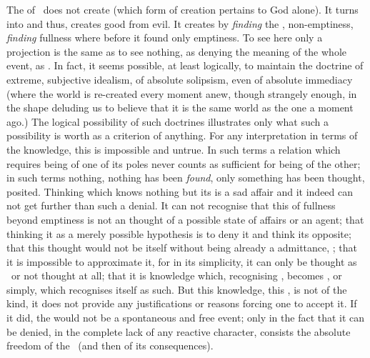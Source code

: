  The  of \yes\ does not create  (which form of creation
 pertains to God alone). It turns  into  and thus, creates good from evil.  It creates
  by {\em finding} the , non-emptiness, {\em
   finding} fullness where before it found only emptiness.  To see here only a
 projection is the same as to see nothing, as denying the meaning of the whole
 event, as .  In fact, it seems possible, at least logically, to maintain the
 doctrine of extreme, subjective idealism, of absolute solipsism, even of
 absolute immediacy (where the world is re-created every moment anew, though
 strangely enough, in the shape deluding us to believe that it is the same world
 as the one a moment ago.) The logical possibility of such doctrines illustrates
 only what such a possibility is worth as a criterion of anything.  For any
 interpretation in terms of the  knowledge, this  is
 impossible and untrue. In such terms a relation which requires being of one of
 its poles never counts as sufficient for being of the other; in such terms
 nothing, nothing  has been {\em found}, only something has been
 thought,  posited. Thinking which knows nothing but its
  is a sad affair and it indeed can not get further than
 such a denial. It can not recognise that this  of fullness beyond
 emptiness is not an  thought of a possible state of affairs or an
  agent; that thinking it as a merely possible hypothesis is to deny
 it and think its opposite; that this thought would not be itself without being
 already a  admittance, ; that it is impossible to
 approximate it, for in its simplicity, it can only be thought as \yes\ or not
 thought at all; that it is knowledge which, {recognising} ,
 becomes , or simply,  which {recognises}
 itself as such. But this knowledge, this , is not of the 
 kind, it does not provide any  justifications or reasons forcing
 one to accept it. If it did, the  would not be a spontaneous and
 free event; only in the fact that it can be denied, in the complete lack of any
 reactive character, consists the absolute freedom of the \sch\ (and then of its
 consequences).  



